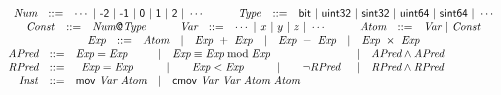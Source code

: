 
\begin{figure*}
  \centering
  \begin{math}
    \begin{array}{rclclcl}
      \multicolumn{7}{c}{
      \begin{array}{rclcrcl}
        \clNum & ::= & \cdots \ |\ \mytextsf{-2} \ |\ \mytextsf{-1}
                     \ |\ \mytextsf{0} \ |\ \mytextsf{1} \ |\
                     \mytextsf{2} \ |\  \cdots
        & \hspace{1em} &
        \mathit{Type} & ::= & \mytextsf{bit}\ |\
                              \mytextsf{uint32}\ |\ \mytextsf{sint32}\ |\
                              \mytextsf{uint64}\ |\ \mytextsf{sint64}\ |\ \cdots
      \end{array}
      }\\
      \multicolumn{7}{c}{
      \begin{array}{rclcrclcrcl}
      \mathit{Const} & ::= & \clNum\mytextsf{@}\mathit{Type}
      & \hspace{1em} &
      \clVar & ::= & \cdots\ |\ x \ |\ y \ |\ z \ |\ \cdots
      & \hspace{1em} &
      \clAtom & ::= & \clVar \ |\ \mathit{Const}
      \end{array}
      }
      \\
      \multicolumn{7}{c}{
      \begin{array}{rclclclcl}
        \clExp & ::= & \clAtom
        & | & \clExp\ +\ \clExp
        & | & \clExp\ -\ \clExp
        & | & \clExp\ \times\ \clExp
      \end{array}
      }
      \\
      \clAPred & ::= &
        \clExp = \clExp
      & | & \clExp \equiv \clExp \bmod \clExp
      & | & \clAPred \wedge \clAPred
      \\
      \clRPred & ::= &
      \multicolumn{3}{l}{
        \begin{array}{lclclcl}
          \clExp = \clExp
          & \hspace{2em}|\hspace{1em} & \clExp < \clExp
          & \hspace{2em}|\hspace{1em} & \neg \clRPred
        \end{array}
      }
      & | & \clRPred \wedge \clRPred
      \\
      \mathit{Inst} & ::= &
            \clMov\ \clVar\ \clAtom
      & | & \clCmov\ \clVar\ \clVar\
            \clAtom\ \clAtom

\end{array}
\end{math}
\end{figure*}
